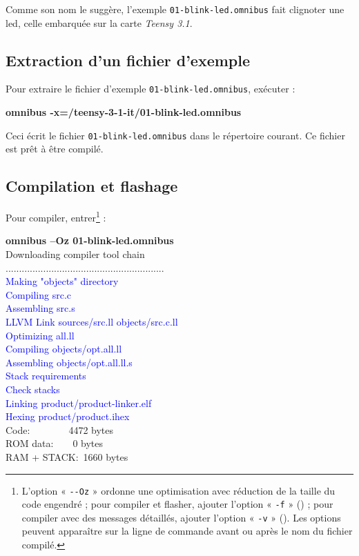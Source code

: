 Comme son nom le suggère, l'exemple \texttt{01-blink-led.omnibus} fait clignoter une led, celle embarquée sur la carte \emph{Teensy 3.1}.

\subsection{Extraction d'un fichier d'exemple}

Pour extraire le fichier d'exemple \texttt{01-blink-led.omnibus}, exécuter :

\begin{SHELL}
\bfseries omnibus -x=/teensy-3-1-it/01-blink-led.omnibus
\end{SHELL}


Ceci écrit le fichier \texttt{01-blink-led.omnibus} dans le répertoire courant. Ce fichier est prêt à être compilé.

\subsection{Compilation et flashage}

Pour compiler, entrer\footnote{L'option « \texttt{-{}-Oz} » ordonne une optimisation avec réduction de la taille du code engendré ; pour compiler et flasher, ajouter l'option « \texttt{-f} » () ; pour compiler avec des messages détaillés, ajouter l'option « \texttt{-v} » (). Les options peuvent apparaître sur la ligne de commande avant ou après le nom du fichier compilé.} :
\begin{SHELL}
{\bfseries omnibus --Oz 01-blink-led.omnibus}\\
Downloading compiler tool chain\\
...........................................................\\
\textcolor{blue}{Making "objects" directory}\\
\textcolor{blue}{Compiling src.c}\\
\textcolor{blue}{Assembling src.s}\\
\textcolor{blue}{LLVM Link sources/src.ll objects/src.c.ll}\\
\textcolor{blue}{Optimizing all.ll}\\
\textcolor{blue}{Compiling objects/opt.all.ll}\\
\textcolor{blue}{Assembling objects/opt.all.ll.s}\\
\textcolor{blue}{Stack requirements}\\
\textcolor{blue}{Check stacks}\\
\textcolor{blue}{Linking product/product-linker.elf}\\
\textcolor{blue}{Hexing product/product.ihex}\\
Code:~~~~~~~~4472 bytes\\
ROM data:~~~~0 bytes\\
RAM + STACK:~1660 bytes\\
\end{SHELL}


